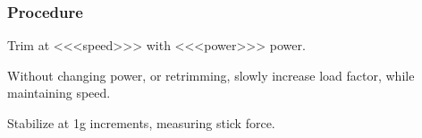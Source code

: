 % 
% 
%
 \subsubsection*{Procedure}
 \begin{compactenum}
   \item Trim at <<<speed>>> with <<<power>>> power.
   \item  Without changing power, or retrimming, slowly increase load factor, while maintaining speed.
   \item Stabilize at 1g increments, measuring stick force.
      \end{compactenum}